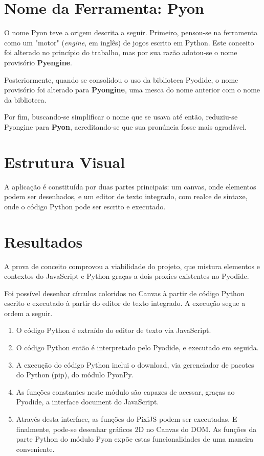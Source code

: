 \begin{apendicesenv}
\section{Nome da Ferramenta: Pyon}

O nome Pyon teve a origem descrita a seguir. Primeiro, pensou-se na ferramenta como um "motor"
(\textit{engine}, em inglês) de jogos escrito em Python. Este conceito foi alterado no princípio do trabalho, mas por sua razão adotou-se o nome provisório \textbf{Pyengine}.

Posteriormente, quando se consolidou o uso da biblioteca Pyodide, o nome provisório foi alterado para
\textbf{Pyongine}, uma mesca do nome anterior com o nome da biblioteca.

Por fim, buscando-se simplificar o nome que se usava até então, reduziu-se Pyongine para \textbf{Pyon},
acreditando-se que sua pronúncia fosse mais agradável.

\section{Estrutura Visual}

A aplicação é constituída por duas partes principais: um canvas, onde elementos podem ser desenhados, e um editor de texto integrado, com realce de sintaxe, onde o código Python pode ser escrito e executado.

\section{Resultados}

A prova de conceito comprovou a viabilidade do projeto, que mistura elementos e contextos do JavaScript e Python graças a dois proxies existentes no Pyodide.

Foi possível desenhar círculos coloridos no Canvas à partir de código Python escrito e executado à partir do editor de texto integrado. A execução segue a ordem a seguir.

\begin{enumerate}
    \item O código Python é extraído do editor de texto via JavaScript.
    \item O código Python então é interpretado pelo Pyodide, e executado em seguida.
    \item A execução do código Python inclui o download, via gerenciador de pacotes do Python (pip), do módulo PyonPy.
    \item As funções constantes neste módulo são capazes de acessar, graças ao Pyodide, a interface
    document do JavaScript.
    \item Através desta interface, as funções do PixiJS podem ser executadas. E finalmente, pode-se desenhar gráficos 2D no Canvas do DOM. As funções da parte Python do módulo Pyon expõe estas funcionalidades de uma maneira conveniente.
\end{enumerate}

\end{apendicesenv}
